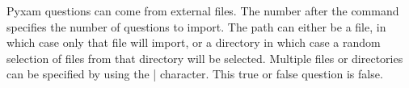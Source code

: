     \tf[F] Pyxam questions can come from external files. The number after the command specifies the number of questions to import.
    The path can either be a file, in which case only that file will import, or a directory in which case a random selection
    of files from that directory will be selected. Multiple files or directories can be specified by using the | character.
    This true or false question is false.
